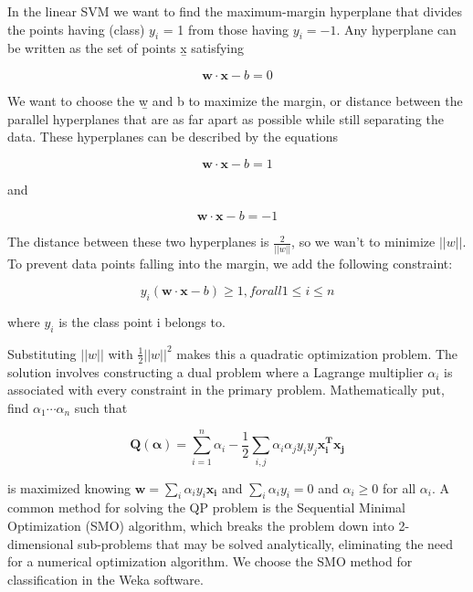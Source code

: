 In the linear SVM we want to find the maximum-margin hyperplane that divides the points having (class) $y_{i}$ = 1 from those having $y_i = -1$. Any hyperplane can be written as the set of points \b{x} satisfying

\begin{equation}
\mathbf{w \cdot x} - b = 0
\end{equation}

We want to choose the \b{w} and b to maximize the margin, or distance between the parallel hyperplanes that are as far apart as possible while still separating the data. These hyperplanes can be described by the equations

\begin{equation}
\mathbf{w \cdot x} - b = 1
\end{equation}

and

\begin{equation}
\mathbf{w \cdot x} - b = -1
\end{equation}

The distance between these two hyperplanes is $\frac{2}{||w||}$, so we wan't to minimize $||w||$.
To prevent data points falling into the margin, we add the following constraint:

\begin{equation}
y_i(\mathbf{w \cdot x} - b) \geq 1, for all 1 \leq i \leq n
\end{equation}

where $y_i$ is the class point i belongs to.

Substituting $||w||$ with $\frac{1}{2}||w||^2$ makes this a quadratic optimization problem. 
The solution involves constructing a dual problem where 
a Lagrange multiplier $\alpha_i$ 
is associated with every 
constraint in the primary problem. Mathematically put, find $\alpha_1 \cdots \alpha_n$
such that

\begin{equation}
\mathbf{Q(\alpha)} = \sum_{i=1}^{n}{\alpha_i} - \frac{1}{2}\sum_{i,j}{\alpha_i\alpha_j y_i y_j \mathbf{x_i^T x_j} }
\end{equation}

is maximized knowing $\mathbf{w} = \sum_{i}{ \alpha_i y_i \mathbf{x_i} }$ and $\sum_{i}{\alpha_i y_i} = 0$ and $\alpha_i \geq 0$ for all $\alpha_i$.  
A common method for solving the QP problem is the Sequential Minimal Optimization (SMO) algorithm, 
which breaks the problem down into 2-dimensional sub-problems that may be solved analytically, eliminating the need for a numerical optimization algorithm.
We choose the SMO method for classification in the Weka software.

